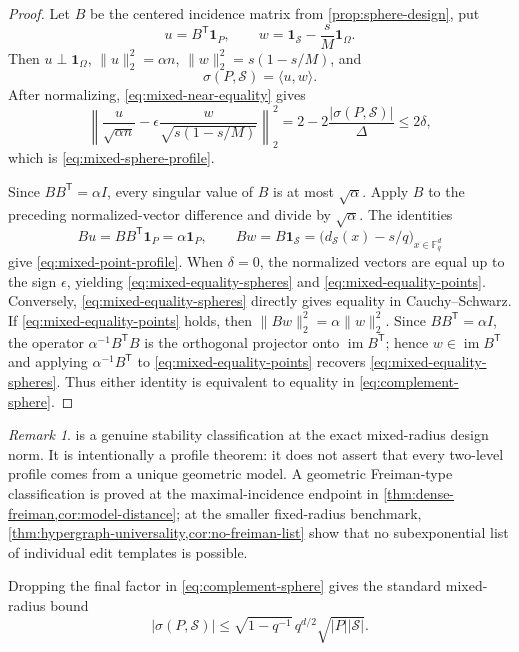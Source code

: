 \documentclass[11pt,letterpaper]{amsart}
\theoremstyle{definition}
\theoremstyle{remark}
\newtheorem{remark}[remark]{Remark}
\newcommand{\1}{\mathbf 1}
\begin{document}
\begin{proof}
Let $B$ be the centered incidence matrix from \cref{prop:sphere-design}, put
\[
 u=B^{\mathsf T}\1_P,
 \qquad
 w=\1_{\mathcal S}-\frac sM\1_\Omega.
\]
Then $u\perp\1_\Omega$, $\|u\|_2^2=\alpha n$, $\|w\|_2^2=s(1-s/M)$, and
\[
 \sigma(P,\mathcal S)=\langle u,w\rangle.
\]
After normalizing, \eqref{eq:mixed-near-equality} gives
\[
 \left\|
 \frac u{\sqrt{\alpha n}}
 -\epsilon\frac w{\sqrt{s(1-s/M)}}
 \right\|_2^2
 =2-2\frac{|\sigma(P,\mathcal S)|}{\Delta}
 \le2\delta,
\]
which is \eqref{eq:mixed-sphere-profile}.

Since $BB^{\mathsf T}=\alpha I$, every singular value of $B$ is at most $\sqrt\alpha$.  Apply $B$ to the preceding normalized-vector difference and divide by $\sqrt\alpha$.  The identities
\[
 Bu=BB^{\mathsf T}\1_P=\alpha\1_P,
 \qquad
 Bw=B\1_{\mathcal S}
 =\bigl(d_{\mathcal S}(x)-s/q\bigr)_{x\in\mathbb F_q^d}
\]
give \eqref{eq:mixed-point-profile}.  When $\delta=0$, the normalized vectors are equal up to the sign $\epsilon$, yielding \eqref{eq:mixed-equality-spheres} and \eqref{eq:mixed-equality-points}.  Conversely, \eqref{eq:mixed-equality-spheres} directly gives equality in Cauchy--Schwarz.  If \eqref{eq:mixed-equality-points} holds, then $\|Bw\|_2^2=\alpha\|w\|_2^2$.  Since $BB^{\mathsf T}=\alpha I$, the operator $\alpha^{-1}B^{\mathsf T}B$ is the orthogonal projector onto $\operatorname{im}B^{\mathsf T}$; hence $w\in\operatorname{im}B^{\mathsf T}$ and applying $\alpha^{-1}B^{\mathsf T}$ to \eqref{eq:mixed-equality-points} recovers \eqref{eq:mixed-equality-spheres}.  Thus either identity is equivalent to equality in \eqref{eq:complement-sphere}.
\end{proof}

\begin{remark}\label{rem:classification-scope}
 is a genuine stability classification at the exact mixed-radius design norm.  It is intentionally a profile theorem: it does not assert that every two-level profile comes from a unique geometric model.  A geometric Freiman-type classification is proved at the maximal-incidence endpoint in \cref{thm:dense-freiman,cor:model-distance}; at the smaller fixed-radius benchmark, \cref{thm:hypergraph-universality,cor:no-freiman-list} show that no subexponential list of individual edit templates is possible.
\end{remark}

Dropping the final factor in \eqref{eq:complement-sphere} gives the standard mixed-radius bound
\begin{equation}\label{eq:mixed-bound}
 |\sigma(P,\mathcal S)|
 \le \sqrt{1-q^{-1}}\,q^{d/2}\sqrt{|P||\mathcal S|}.
\end{equation}
\end{document}
